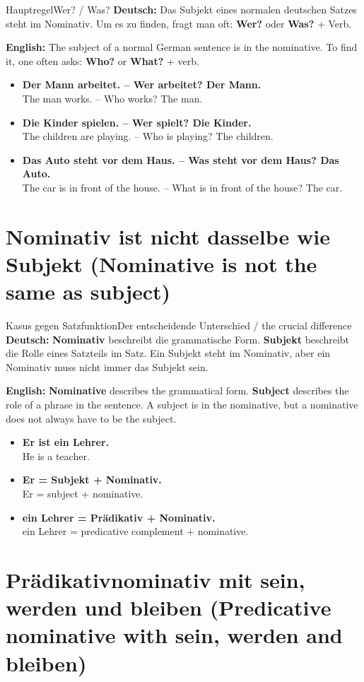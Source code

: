 \documentclass[a4paper,11pt]{article}
\newcommand{\GermanText}[1]{\textbf{Deutsch: }#1\par}
\newcommand{\EnglishText}[1]{{\small\color{SoftGray}\textbf{English: }#1\par}}
\newcommand{\ExampleItem}[2]{\item \textbf{#1}\\{\small\color{SoftGray}#2}}
\begin{document}
\begin{grammarentry}{Hauptregel}{Wer? / Was?}
\GermanText{Das Subjekt eines normalen deutschen Satzes steht im Nominativ. Um es zu finden, fragt man oft: \textbf{Wer?} oder \textbf{Was?} + Verb.}
\EnglishText{The subject of a normal German sentence is in the nominative. To find it, one often asks: \textbf{Who?} or \textbf{What?} + verb.}
\end{grammarentry}

\begin{exbox}
\begin{itemize}
\ExampleItem{Der Mann arbeitet. -- Wer arbeitet? Der Mann.}{The man works. -- Who works? The man.}
\ExampleItem{Die Kinder spielen. -- Wer spielt? Die Kinder.}{The children are playing. -- Who is playing? The children.}
\ExampleItem{Das Auto steht vor dem Haus. -- Was steht vor dem Haus? Das Auto.}{The car is in front of the house. -- What is in front of the house? The car.}
\end{itemize}
\end{exbox}

\section{Nominativ ist nicht dasselbe wie Subjekt \textnormal{(Nominative is not the same as subject)}}

\begin{grammarentry}{Kasus gegen Satzfunktion}{Der entscheidende Unterschied / the crucial difference}
\GermanText{\textbf{Nominativ} beschreibt die grammatische Form. \textbf{Subjekt} beschreibt die Rolle eines Satzteils im Satz. Ein Subjekt steht im Nominativ, aber ein Nominativ muss nicht immer das Subjekt sein.}
\EnglishText{\textbf{Nominative} describes the grammatical form. \textbf{Subject} describes the role of a phrase in the sentence. A subject is in the nominative, but a nominative does not always have to be the subject.}
\end{grammarentry}

\begin{exbox}
\begin{itemize}
\ExampleItem{Er ist ein Lehrer.}{He is a teacher.}
\ExampleItem{Er = Subjekt + Nominativ.}{Er = subject + nominative.}
\ExampleItem{ein Lehrer = Prädikativ + Nominativ.}{ein Lehrer = predicative complement + nominative.}
\end{itemize}
\end{exbox}

\section{Prädikativnominativ mit sein, werden und bleiben \textnormal{(Predicative nominative with sein, werden and bleiben)}}
\end{document}
